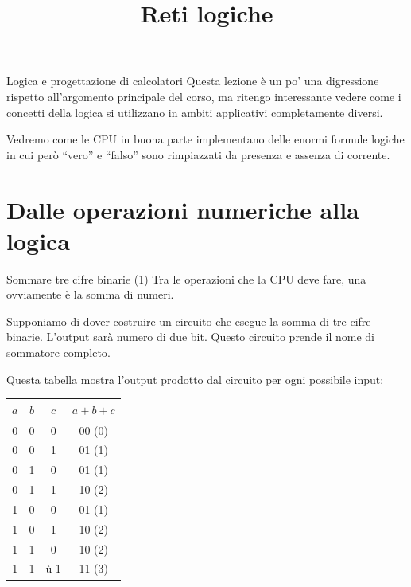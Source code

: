 \documentclass[aspectratio=169,10pt,dvipsnames,xcolor=table,handout]{beamer}
\title{Reti logiche}
\begin{document}
\begin{frame}
    \titlepage
\end{frame}

\begin{frame}{Logica e progettazione di calcolatori}
    Questa lezione è un po' una digressione rispetto all'argomento principale del corso, ma ritengo interessante vedere come i concetti della logica si utilizzano in ambiti applicativi completamente diversi.

    \medskip
    Vedremo come le CPU in buona parte implementano delle enormi formule logiche in cui però ``vero'' e ``falso'' sono rimpiazzati da presenza e assenza di corrente.
\end{frame}

\section{Dalle operazioni numeriche alla logica}

\begin{frame}{Sommare tre cifre binarie (1)}
    Tra le operazioni che la CPU deve fare, una ovviamente è la somma di numeri.

    \medskip
    Supponiamo di dover costruire un circuito che esegue la somma di tre cifre binarie. L'output sarà numero di due bit. Questo circuito prende il nome di \alert{sommatore completo}.

    \medskip
    Questa tabella mostra l'output prodotto dal circuito per ogni possibile input:
    \begin{center}
        \begin{tabular}{|c|c|c||c|}
            $a$ & $b$ & $c$ & $a+b+c$ \\
            \hline
            0   & 0   & 0   & 00 (0)  \\
            0   & 0   & 1   & 01 (1)  \\
            0   & 1   & 0   & 01 (1)  \\
            0   & 1   & 1   & 10 (2)  \\
            1   & 0   & 0   & 01 (1)  \\
            1   & 0   & 1   & 10 (2)  \\
            1   & 1   & 0   & 10 (2)  \\
            1   & 1   &ù 1   & 11 (3)  \\
        \end{tabular}
    \end{center}
\end{frame}
\end{document}
